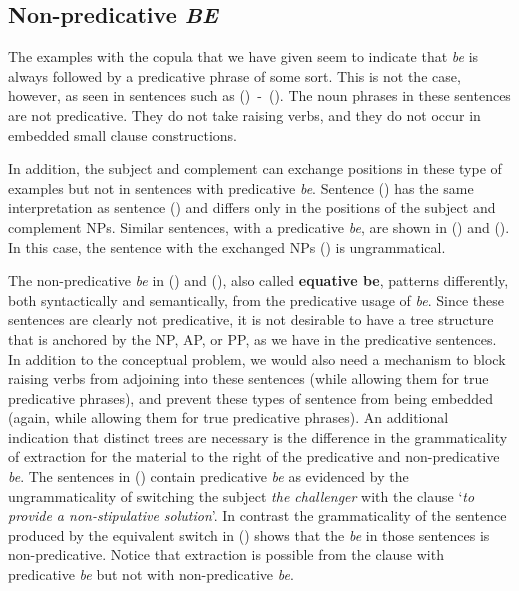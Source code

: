 \subsection{Non-predicative {\it BE}}
\label{equative-be-xtag-analysis}

The examples with the copula that we have given seem to indicate that {\it be}
is always followed by a predicative phrase of some sort.  This is not the case,
however, as seen in sentences such as ({})~-~({}).  The noun phrases in
these sentences are not predicative.  They do not take raising verbs, and they
do not occur in embedded small clause constructions.




In addition, the subject and complement can exchange positions in these type of
examples but not in sentences with predicative {\it be}.  Sentence ({})
has the same interpretation as sentence ({}) and differs only in the
positions of the subject and complement NPs. Similar sentences, with a
predicative {\it be}, are shown in ({}) and ({}).  In this case,
the sentence with the exchanged NPs ({}) is ungrammatical.


The non-predicative {\it be} in ({}) and ({}), also called {\bf
equative be}, patterns differently, both syntactically and semantically, from
the predicative usage of {\it be}.  Since these sentences are clearly not
predicative, it is not desirable to have a tree structure that is anchored by
the NP, AP, or PP, as we have in the predicative sentences.  In addition to the
conceptual problem, we would also need a mechanism to block raising verbs from
adjoining into these sentences (while allowing them for true predicative
phrases), and prevent these types of sentence from being embedded (again, while
allowing them for true predicative phrases).  An additional indication that
distinct trees are necessary is the difference in the grammaticality of
extraction for the material to the right of the predicative and non-predicative
{\it be}.  The sentences in ({}) contain predicative {\it be} as
evidenced by the ungrammaticality of switching the subject {\it the challenger}
with the clause `{\it to provide a non-stipulative solution}'. In contrast the
grammaticality of the sentence produced by the equivalent switch in ({})
shows that the {\it be} in those sentences is non-predicative. Notice that
extraction is possible from the clause with predicative {\it be} but not with
non-predicative {\it be}.

